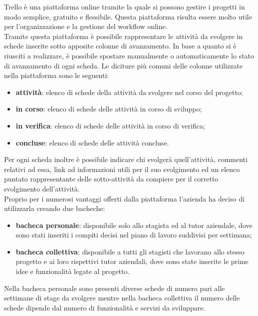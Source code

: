 Trello è una piattaforma online tramite la quale si possono gestire i progetti in modo semplice, gratuito e flessibile. Questa piattaforma risulta essere molto utile per l'organizzazione e la gestione del workflow online.\\
Tramite questa piattaforma è possibile rappresentare le attività da svolgere in schede inserite sotto apposite colonne di avanzamento. In base a quanto si è riusciti a realizzare, è possibile spostare manualmente o automaticamente lo stato di avanzamento di ogni scheda. Le diciture più comuni delle colonne utilizzate nella piattaforma sono le seguenti:
\begin{itemize}
	\item \textbf{attività}: elenco di schede della attività da svolgere nel corso del progetto;
	\item \textbf{in corso}: elenco di schede delle attività in corso di sviluppo;
	\item \textbf{in verifica}: elenco di schede delle attività in corso di verifica;
	\item \textbf{concluse}: elenco di schede delle attività concluse.
\end{itemize}
Per ogni scheda inoltre è possibile indicare chi svolgerà quell'attività, commenti relativi ad essa, link ad informazioni utili per il suo svolgimento ed un elenco puntato rappresentante delle sotto-attività da compiere per il corretto svolgimento dell'attività.\\
Proprio per i numerosi vantaggi offerti dalla piattaforma l'azienda ha deciso di utilizzarla creando due bacheche:
\begin{itemize}
	\item \textbf{bacheca personale}: disponibile solo allo stagista ed al tutor aziendale, dove sono stati inseriti i compiti decisi nel piano di lavoro suddivisi per settimana;
	\item\textbf{bacheca collettiva}: disponibile a tutti gli stagisti che lavorano allo stesso progetto e ai loro rispettivi tutor aziendali, dove sono state inserite le prime idee e funzionalità legate al progetto.
\end{itemize}
Nella bacheca personale sono presenti diverse schede di numero pari alle settimane di stage da svolgere mentre nella bacheca collettiva il numero delle schede dipende dal numero di funzionalità e servizi da sviluppare. 

